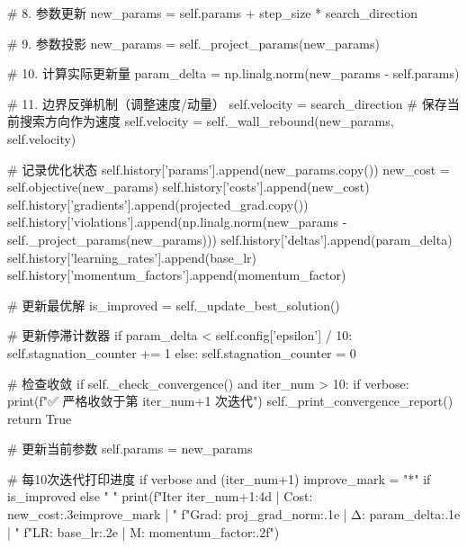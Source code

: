 \documentclass[a4paper,12pt]{article}
\begin{document}
\begin{python}
                # 8. 参数更新
                new_params = self.params + step_size * search_direction
                
                # 9. 参数投影
                new_params = self._project_params(new_params)
                
                # 10. 计算实际更新量
                param_delta = np.linalg.norm(new_params - self.params)
                
                # 11. 边界反弹机制（调整速度/动量）
                self.velocity = search_direction  # 保存当前搜索方向作为速度
                self.velocity = self._wall_rebound(new_params, self.velocity)
                
                # 记录优化状态
                self.history['params'].append(new_params.copy())
                new_cost = self.objective(new_params)
                self.history['costs'].append(new_cost)
                self.history['gradients'].append(projected_grad.copy())
                self.history['violations'].append(np.linalg.norm(new_params - self._project_params(new_params)))
                self.history['deltas'].append(param_delta)
                self.history['learning_rates'].append(base_lr)
                self.history['momentum_factors'].append(momentum_factor)
                
                # 更新最优解
                is_improved = self._update_best_solution()
                
                # 更新停滞计数器
                if param_delta < self.config['epsilon'] / 10:
                    self.stagnation_counter += 1
                else:
                    self.stagnation_counter = 0
                
                # 检查收敛
                if self._check_convergence() and iter_num > 10:
                    if verbose:
                        print(f"\n✅ 严格收敛于第 {iter_num+1} 次迭代")
                        self._print_convergence_report()
                    return True
                
                # 更新当前参数
                self.params = new_params
                
                # 每10次迭代打印进度
                if verbose and (iter_num+1) %
                    improve_mark = "*" if is_improved else " "
                    print(f"Iter {iter_num+1:4d} | Cost: {new_cost:.3e}{improve_mark} | "
                          f"Grad: {proj_grad_norm:.1e} | Δ: {param_delta:.1e} | "
                          f"LR: {base_lr:.2e} | M: {momentum_factor:.2f}")


\end{python}
\end{document}
